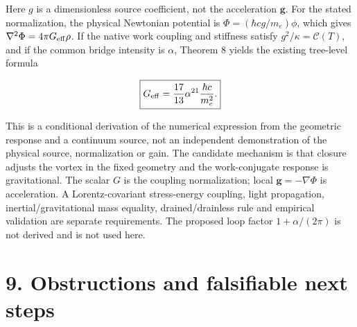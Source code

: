 \documentclass[
  11pt,
]{article}
\begin{document}
Here \(g\) is a dimensionless source coefficient, not the acceleration
\(\mathbf g\). For the stated normalization, the physical Newtonian
potential is \(\Phi=(\hbar c g/m_e)\phi\), which gives
\(\nabla^2\Phi=4\pi G_{\rm eff}\rho\). If the native work coupling and
stiffness satisfy \(g^2/\kappa=\mathcal C(T)\), and if the common bridge
intensity is \(\alpha\), Theorem 8 yields the existing tree-level
formula

\[\boxed{G_{\rm eff}=\frac{17}{13}\alpha^{21}\frac{\hbar c}{m_e^2}.}\]

This is a conditional derivation of the numerical expression from the
geometric response and a continuum source, not an independent
demonstration of the physical source, normalization or gain. The
candidate mechanism is that closure adjusts the vortex in the fixed
geometry and the work-conjugate response is gravitational. The scalar
\(G\) is the coupling normalization; local \(\mathbf g=-\nabla\Phi\) is
acceleration. A Lorentz-covariant stress-energy coupling, light
propagation, inertial/gravitational mass equality, drained/drainless
rule and empirical validation are separate requirements. The proposed
loop factor \(1+\alpha/(2\pi)\) is not derived and is not used here.

\section{9. Obstructions and falsifiable next
steps}\label{obstructions-and-falsifiable-next-steps}
\end{document}
